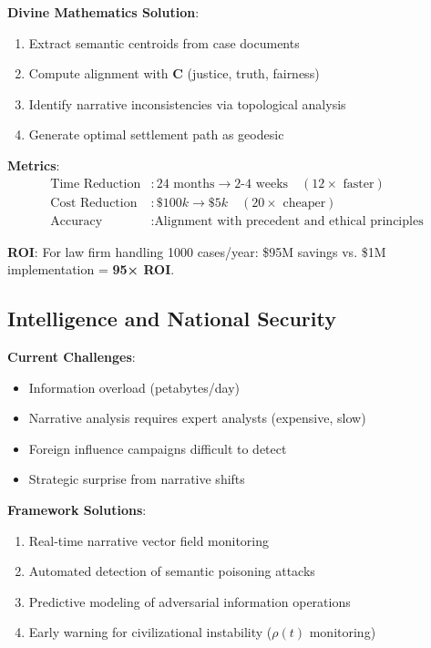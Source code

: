\documentclass[11pt,a4paper]{article}
\theoremstyle{definition}
\theoremstyle{remark}
\begin{document}
\textbf{Divine Mathematics Solution}:
\begin{enumerate}
\item Extract semantic centroids from case documents
\item Compute alignment with \(\mathbf{C}\) (justice, truth, fairness)
\item Identify narrative inconsistencies via topological analysis
\item Generate optimal settlement path as geodesic
\end{enumerate}

\textbf{Metrics}:
\begin{align}
\text{Time Reduction} &: 24 \text{ months} \to 2\text{-}4 \text{ weeks} \quad (12\times \text{ faster}) \\
\text{Cost Reduction} &: \$100k \to \$5k \quad (20\times \text{ cheaper}) \\
\text{Accuracy} &: \text{Alignment with precedent and ethical principles}
\end{align}

\textbf{ROI}: For law firm handling 1000 cases/year: \$95M savings vs. \$1M implementation = \textbf{95× ROI}.

\subsection{Intelligence and National Security}

\textbf{Current Challenges}:
\begin{itemize}
\item Information overload (petabytes/day)
\item Narrative analysis requires expert analysts (expensive, slow)
\item Foreign influence campaigns difficult to detect
\item Strategic surprise from narrative shifts
\end{itemize}

\textbf{Framework Solutions}:
\begin{enumerate}
\item Real-time narrative vector field monitoring
\item Automated detection of semantic poisoning attacks
\item Predictive modeling of adversarial information operations
\item Early warning for civilizational instability (\(\rho(t)\) monitoring)
\end{enumerate}
\end{document}
